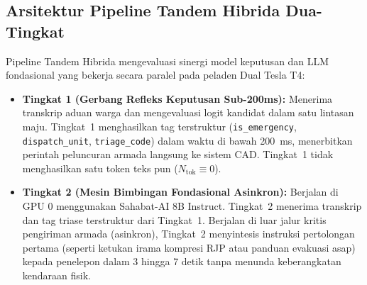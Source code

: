 \documentclass[journal,compsoc]{IEEEtran}
\begin{document}
\subsection{Arsitektur Pipeline Tandem Hibrida Dua-Tingkat}
Pipeline Tandem Hibrida mengevaluasi sinergi model keputusan dan LLM fondasional yang bekerja secara paralel pada peladen Dual Tesla T4:
\begin{itemize}
    \item \textbf{Tingkat 1 (Gerbang Refleks Keputusan Sub-200ms):} Menerima transkrip aduan warga dan mengevaluasi logit kandidat dalam satu lintasan maju. Tingkat~1 menghasilkan tag terstruktur (\texttt{is\_emergency}, \texttt{dispatch\_unit}, \texttt{triage\_code}) dalam waktu di bawah 200~ms, menerbitkan perintah peluncuran armada langsung ke sistem CAD. Tingkat~1 tidak menghasilkan satu token teks pun ($N_{\text{tok}} \equiv 0$).
    \item \textbf{Tingkat 2 (Mesin Bimbingan Fondasional Asinkron):} Berjalan di GPU 0 menggunakan Sahabat-AI 8B Instruct. Tingkat~2 menerima transkrip dan tag triase terstruktur dari Tingkat~1. Berjalan di luar jalur kritis pengiriman armada (asinkron), Tingkat~2 menyintesis instruksi pertolongan pertama (seperti ketukan irama kompresi RJP atau panduan evakuasi asap) kepada penelepon dalam 3 hingga 7 detik tanpa menunda keberangkatan kendaraan fisik.
\end{itemize}
\end{document}
